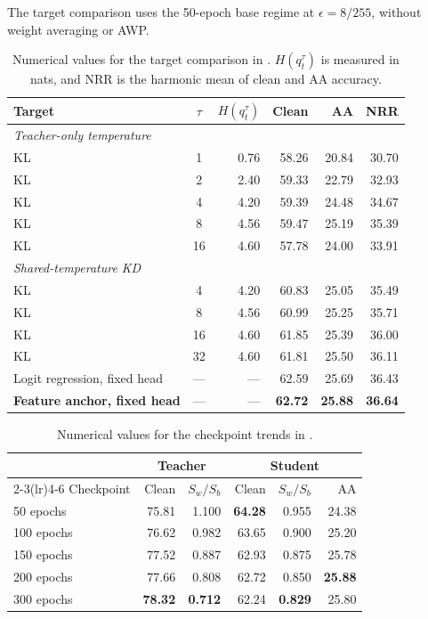 The target comparison uses the 50-epoch base regime at $\epsilon=8/255$, without weight averaging
or AWP.

\begin{table}[!htbp]
  \centering \small \setlength{\tabcolsep}{4pt}
  \caption{Numerical values for the target comparison in .
  $H(q_t^\tau)$ is measured in nats, and NRR is the harmonic mean of clean and AA accuracy.}
  \label{tab:targetcomparison_values}
  \begin{tabular}{lcrrrr}
    \toprule
    Target & $\tau$ & $H(q_t^\tau)$ & Clean & AA & NRR \\
    \midrule
    \multicolumn{6}{l}{\emph{Teacher-only temperature}} \\
    KL & 1  & 0.76 & 58.26 & 20.84 & 30.70 \\
    KL & 2  & 2.40 & 59.33 & 22.79 & 32.93 \\
    KL & 4  & 4.20 & 59.39 & 24.48 & 34.67 \\
    KL & 8  & 4.56 & 59.47 & 25.19 & 35.39 \\
    KL & 16 & 4.60 & 57.78 & 24.00 & 33.91 \\
    \midrule
    \multicolumn{6}{l}{\emph{Shared-temperature KD}} \\
    KL & 4  & 4.20 & 60.83 & 25.05 & 35.49 \\
    KL & 8  & 4.56 & 60.99 & 25.25 & 35.71 \\
    KL & 16 & 4.60 & 61.85 & 25.39 & 36.00 \\
    KL & 32 & 4.60 & 61.81 & 25.50 & 36.11 \\
    \midrule
    Logit regression, fixed head  & --- & --- & 62.59 & 25.69 & 36.43 \\
    \textbf{Feature anchor, fixed head} & --- & --- & \textbf{62.72} & \textbf{25.88} & \textbf{36.64} \\
    \bottomrule
  \end{tabular}
\end{table}

\begin{table}[!htbp]
  \centering \small \setlength{\tabcolsep}{4pt}
  \caption{Numerical values for the checkpoint trends in .}
  \label{tab:teacherladder_values}
  \begin{tabular}{lrrrrr}
    \toprule
    & \multicolumn{2}{c}{Teacher} & \multicolumn{3}{c}{Student} \\
    \cmidrule(lr){2-3}\cmidrule(lr){4-6}
    Checkpoint & Clean & $S_w/S_b$ & Clean & $S_w/S_b$ & AA \\
    \midrule
    50 epochs  & 75.81 & 1.100 & \textbf{64.28} & 0.955 & 24.38 \\
    100 epochs & 76.62 & 0.982 & 63.65 & 0.900 & 25.20 \\
    150 epochs & 77.52 & 0.887 & 62.93 & 0.875 & 25.78 \\
    200 epochs & 77.66 & 0.808 & 62.72 & 0.850 & \textbf{25.88} \\
    300 epochs & \textbf{78.32} & \textbf{0.712} & 62.24 & \textbf{0.829} & 25.80 \\
    \bottomrule
  \end{tabular}
\end{table}

